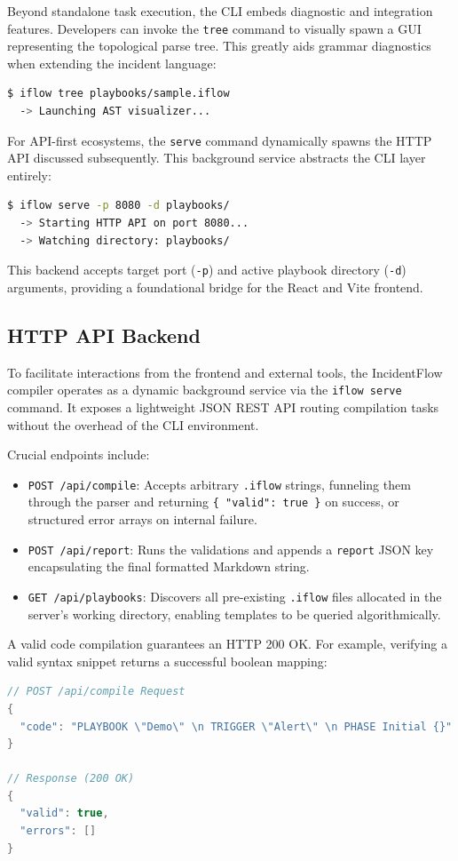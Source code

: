 Beyond standalone task execution, the CLI embeds diagnostic and integration features. Developers can invoke the \texttt{tree} command to visually spawn a GUI representing the topological parse tree. This greatly aids grammar diagnostics when extending the incident language:
\begin{lstlisting}[language=bash]
$ iflow tree playbooks/sample.iflow
  -> Launching AST visualizer...
\end{lstlisting}

For API-first ecosystems, the \texttt{serve} command dynamically spawns the HTTP API discussed subsequently. This background service abstracts the CLI layer entirely:
\begin{lstlisting}[language=bash]
$ iflow serve -p 8080 -d playbooks/
  -> Starting HTTP API on port 8080...
  -> Watching directory: playbooks/
\end{lstlisting}
This backend accepts target port (\texttt{-p}) and active playbook directory (\texttt{-d}) arguments, providing a foundational bridge for the React and Vite frontend.
\subsection{HTTP API Backend}
\label{subsec:impl_api}

To facilitate interactions from the frontend and external tools, the IncidentFlow compiler operates as a dynamic background service via the \texttt{iflow serve} command. It exposes a lightweight JSON REST API routing compilation tasks without the overhead of the CLI environment.

Crucial endpoints include:
\begin{itemize}
    \item \texttt{POST /api/compile}: Accepts arbitrary \texttt{.iflow} strings, funneling them through the parser and returning \texttt{\{ "valid": true \}} on success, or structured error arrays on internal failure.
    \item \texttt{POST /api/report}: Runs the validations and appends a \texttt{report} JSON key encapsulating the final formatted Markdown string.
    \item \texttt{GET /api/playbooks}: Discovers all pre-existing \texttt{.iflow} files allocated in the server's working directory, enabling templates to be queried algorithmically.
\end{itemize}

A valid code compilation guarantees an HTTP 200 OK. For example, verifying a valid syntax snippet returns a successful boolean mapping:
\begin{lstlisting}[language=java]
// POST /api/compile Request
{
  "code": "PLAYBOOK \"Demo\" \n TRIGGER \"Alert\" \n PHASE Initial {}"
}

// Response (200 OK)
{
  "valid": true,
  "errors": []
}
\end{lstlisting}

